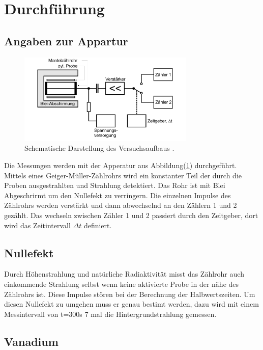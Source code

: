 \section{Durchführung}

\subsection{Angaben zur Appartur}

\begin{figure}[H]
    \centering
    \includegraphics[width=0.75\textwidth]{images/Theorie3.PNG}
    \caption{Schematische Darstellung des Versuchsaufbaus \protect \cite{V702}.}
    \label{img:Apparatur}
 \end{figure}

 \noindent Die Messungen werden mit der Apperatur aus Abbildung(\ref{img:Apparatur}) durchgeführt. Mittels eines Geiger-Müller-Zählrohrs wird ein konstanter 
 Teil der durch die Proben ausgestrahlten \beta und \gamma Strahlung detektiert. Das Rohr ist mit Blei Abgeschrirmt um den Nullefekt zu verringern.
 Die einzelnen Impulse des Zählrohrs werden verstärkt und dann abwechselnd an den Zählern 1 und 2 gezählt. Das wechseln zwischen Zähler 1 und 2 
 passiert durch den Zeitgeber, dort wird das Zeitintervall $\Delta t$ definiert.

 \subsection{Nullefekt}

 \noindent Durch Höhenstrahlung und natürliche Radiaktivität misst das Zählrohr auch einkommende Strahlung selbst wenn keine aktivierte Probe in der 
 nähe des Zählrohrs ist. Diese Impulse stören bei der Berechnung der Halbwertszeiten. Um diesen Nullefekt zu umgehen muss er genau bestimt werden, 
 dazu wird mit einem Messintervall von t=300s 7 mal die Hintergrundstrahlung gemessen.
 

\subsection{Vanadium}

